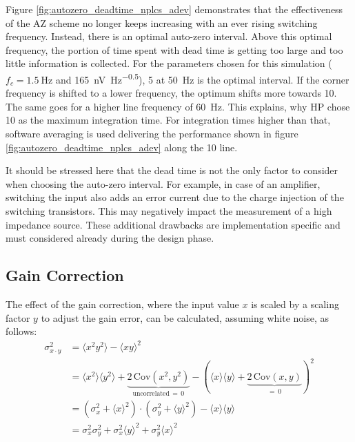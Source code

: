 Figure \ref{fig:autozero_deadtime_nplcs_adev} demonstrates that the effectiveness of the AZ scheme no longer keeps increasing with an ever rising switching frequency. Instead, there is an optimal auto-zero interval. Above this optimal frequency, the portion of time spent with dead time is getting too large and too little information is collected. For the parameters chosen for this simulation ($f_c = \qty{1.5}{\Hz}$ and \qty[power-half-as-sqrt, per-mode=symbol]{165}{\nV \Hz\tothe{-0.5}}), \qty{5}{\plc} at \qty{50}{\Hz} is the optimal interval. If the corner frequency is shifted to a lower frequency, the optimum shifts more towards \qty{10}{\plc}. The same goes for a higher line frequency of \qty{60}{\Hz}. This explains, why HP chose \qty{10}{\plc} as the maximum integration time. For integration times higher than that, software averaging is used delivering the performance shown in figure \ref{fig:autozero_deadtime_nplcs_adev} along the \qty{10}{\plc} line.

It should be stressed here that the dead time is not the only factor to consider when choosing the auto-zero interval. For example, in case of an amplifier, switching the input also adds an error current due to the charge injection of the switching transistors. This may negatively impact the measurement of a high impedance source. These additional drawbacks are implementation specific and must considered already during the design phase.

\subsection{Gain Correction}%
\label{sec:autozero_gain}
The effect of the gain correction, where the input value $x$ is scaled by a scaling factor $y$ to adjust the gain error, can be calculated, assuming white noise, as follows:
\begin{align}
    \sigma_{x \cdot y}^2 &= \langle x^2 y^2 \rangle - \langle x y \rangle^2 \nonumber\\
    &= \langle x^2 \rangle \langle y^2 \rangle + \underbrace{2\,\mathrm{Cov}\left(x^2,y^2\right)}_{\text{uncorrelated} \, = \, 0} - \left( \langle x \rangle \langle y \rangle + \underbrace{2\,\mathrm{Cov}\left(x,y\right)}_{=\, 0} \right)^2 \nonumber\\
    &= \left(\sigma_x^2 + \langle x \rangle^2\right) \cdot \left(\sigma_y^2 + \langle y \rangle^2\right) - \langle x \rangle \langle y \rangle \nonumber\\
    &= \sigma_x^2 \sigma_y^2 + \sigma_x^2 \langle y \rangle^2 + \sigma_y^2 \langle x \rangle^2 \label{eqn:variance_multiplied}
\end{align}

